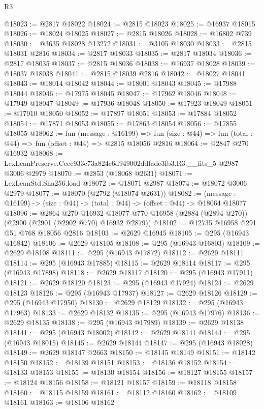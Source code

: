 \begin{lexlean}{R3}
\begin{coremodule}
@18023 := @2817 @18022
@18024 := @2815 @18023
@18025 := @16937 @18015
@18026 := @18024 @18025
@18027 := @2815 @18026
@18028 := @16802 @739
@18030 := @3635 @18028 @13272
@18031 := @3105 @18030
@18033 := @2815 @18031 @2816
@18034 := @2817 @18033
@18035 := @2817 @18034
@18036 := @2817 @18035
@18037 := @2815 @18036
@18038 := @16937 @18028
@18039 := @18037 @18038
@18041 := @2815 @18039 @2816
@18042 := @18027 @18041
@18043 := @18014 @18042
@18044 := @18001 @18043
@18045 := @17988 @18044
@18046 := @17975 @18045
@18047 := @17962 @18046
@18048 := @17949 @18047
@18049 := @17936 @18048
@18050 := @17923 @18049
@18051 := @17910 @18050
@18052 := @17897 @18051
@18053 := @17884 @18052
@18054 := @17871 @18053
@18055 := @17863 @18054
@18056 := @17855 @18055
@18062 := fun (message : @16199) =>
  fun (size : @44) => fun (total : @44) => fun (offset : @44) => @2815 @18056 @2816
@18064 := @2847 @270 @16932
@18068 := LexLeanPreserve.Cecc933c73a824e6d949002ddfade3fb3.R3.__fits_5 @2987 @3006 @2979
@18070 := @2853 (@18068 @2631)
@18071 := LexLeanStd.Sha256.load
@18072 := @18071 @2987
@18074 := @18072 @3006 @2979
@18077 := @18070 (@2792 (@18074 @2631))
@18082 := (message : @16199) -> (size : @44) -> (total : @44) -> (offset : @44) -> @18064 @18077
@18096 := @2864
    @270
    @16932
    @18077
    @770
    @16958
    (@2884 (@2894 @270))
    (@2900 (@2901 (@2902 @770) @16932 @2879))
@18102 := @12735 @16958 @291 @51 @768 @18056 @2816
@18103 := @2629 @16945
@18105 := @295 (@16943 @16842)
@18106 := @2629 @18105
@18108 := @295 (@16943 @16803)
@18109 := @2629 @18108
@18111 := @295 (@16943 @17872)
@18112 := @2629 @18111
@18114 := @295 (@16943 @17885)
@18115 := @2629 @18114
@18117 := @295 (@16943 @17898)
@18118 := @2629 @18117
@18120 := @295 (@16943 @17911)
@18121 := @2629 @18120
@18123 := @295 (@16943 @17924)
@18124 := @2629 @18123
@18126 := @295 (@16943 @17937)
@18127 := @2629 @18126
@18129 := @295 (@16943 @17950)
@18130 := @2629 @18129
@18132 := @295 (@16943 @17963)
@18133 := @2629 @18132
@18135 := @295 (@16943 @17976)
@18136 := @2629 @18135
@18138 := @295 (@16943 @17989)
@18139 := @2629 @18138
@18141 := @295 (@16943 @18002)
@18142 := @2629 @18141
@18144 := @295 (@16943 @18015)
@18145 := @2629 @18144
@18147 := @295 (@16943 @18028)
@18149 := @2629 @18147 @2663
@18150 := @18145 @18149
@18151 := @18142 @18150
@18152 := @18139 @18151
@18153 := @18136 @18152
@18154 := @18133 @18153
@18155 := @18130 @18154
@18156 := @18127 @18155
@18157 := @18124 @18156
@18158 := @18121 @18157
@18159 := @18118 @18158
@18160 := @18115 @18159
@18161 := @18112 @18160
@18162 := @18109 @18161
@18163 := @18106 @18162

\end{coremodule}
\end{lexlean}
